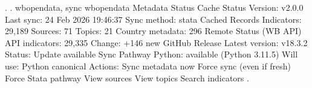 . 
. wbopendata, sync
{\smallskip}
wbopendata Metadata Status
{\smallskip}
  Cache Status
  Version:          v2.0.0
  Last sync:        24 Feb 2026 19:46:37
  Sync method:      stata
{\smallskip}
  Cached Records
  Indicators:          29,189
  Sources:                 71
  Topics:                  21
  Country metadata:       296
{\smallskip}
  Remote Status (WB API)
  API indicators:      29,335
  Change:           +146 new
{\smallskip}
  GitHub Release
  Latest version:   v18.3.2
  Status:           Update available
{\smallskip}
  Sync Pathway
  Python:           available (Python 3.11.5)
  Will use:         Python canonical
{\smallskip}
{\smallskip}
Actions:
{\smallskip}
    Sync metadata now
    Force sync (even if fresh)
    Force Stata pathway
{\smallskip}
    View sources
    View topics
    Search indicators
{\smallskip}
{\smallskip}
. 
